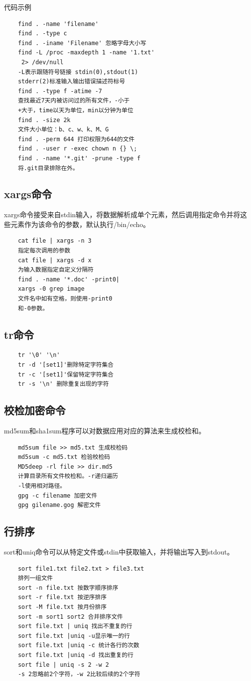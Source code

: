 \documentclass[twocolumn]{article}
\begin{document}
	\noindent 代码示例
	
	\begin{lstlisting}
	find . -name 'filename' 
	find . -type c
	find . -iname 'Filename' 忽略字母大小写
	find -L /proc -maxdepth 1 -name '1.txt'
	 2> /dev/null
	-L表示跟随符号链接 stdin(0),stdout(1)
	stderr(2)标准输入输出错误描述符标号
	find . -type f -atime -7 
	查找最近7天内被访问过的所有文件，-小于
	+大于，time以天为单位，min以分钟为单位
	find . -size 2k
	文件大小单位：b、c、w、k、M、G
	find . -perm 644 打印权限为644的文件
	find . -user r -exec chown n {} \;
	find . -name '*.git' -prune -type f
	将.git目录排除在外。
	\end{lstlisting}
	\subsection{xargs命令}
	xargs命令接受来自stdin输入，将数据解析成单个元素，然后调用指定命令并将这些元素作为该命令的参数，默认执行/bin/echo。
	\begin{lstlisting}
	cat file | xargs -n 3 
	指定每次调用的参数
	cat file | xargs -d x 
	为输入数据指定自定义分隔符
	find . -name '*.doc' -print0|
	xargs -0 grep image
	文件名中如有空格，则使用-print0
	和-0参数。
	\end{lstlisting}
	\subsection{tr命令}
	\begin{lstlisting}
	tr '\0' '\n'
	tr -d '[set1]'删除特定字符集合
	tr -c '[set1]'保留特定字符集合
	tr -s '\n' 删除重复出现的字符
	\end{lstlisting}
	
	\subsection{校检加密命令}
	md5sum和sha1sum程序可以对数据应用对应的算法来生成校检和。
	\begin{lstlisting}
	md5sum file >> md5.txt 生成校检码
	md5sum -c md5.txt 检验校检码
	MD5deep -rl file >> dir.md5
	计算目录所有文件校检和。-r递归遍历
	-l使用相对路径。
	gpg -c filename 加密文件
	gpg gilename.gog 解密文件
	\end{lstlisting}
	\subsection{行排序}
	sort和uniq命令可以从特定文件或stdin中获取输入，并将输出写入到stdout。 
	\begin{lstlisting}
	sort file1.txt file2.txt > file3.txt
	排列一组文件
	sort -n file.txt 按数字顺序排序
	sort -r file.txt 按逆序排序
	sort -M file.txt 按月份排序
	sort -m sort1 sort2 合并排序文件
	sort file.txt | uniq 找出不重复的行
	sort file.txt |uniq -u显示唯一的行
	sort file.txt |uniq -c 统计各行的次数
	sort file.txt |uniq -d 找出重复的行
	sort file | uniq -s 2 -w 2 
	-s 2忽略前2个字符，-w 2比较后续的2个字符
	\end{lstlisting}
	
\end{document}
